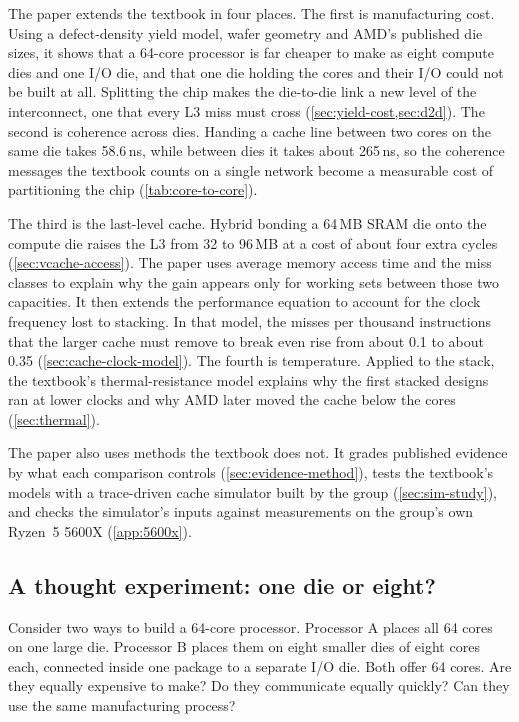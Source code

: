 The paper extends the textbook in four places. The first is manufacturing cost. Using a defect-density yield model, wafer geometry and AMD's published die sizes, it shows that a 64-core processor is far cheaper to make as eight compute dies and one I/O die, and that one die holding the cores and their I/O could not be built at all. Splitting the chip makes the die-to-die link a new level of the interconnect, one that every L3 miss must cross (\cref{sec:yield-cost,sec:d2d}). The second is coherence across dies. Handing a cache line between two cores on the same die takes 58.6\,ns, while between dies it takes about 265\,ns, so the coherence messages the textbook counts on a single network become a measurable cost of partitioning the chip (\cref{tab:core-to-core}).

The third is the last-level cache. Hybrid bonding a 64\,MB SRAM die onto the compute die raises the L3 from 32 to 96\,MB at a cost of about four extra cycles (\cref{sec:vcache-access}). The paper uses average memory access time and the miss classes to explain why the gain appears only for working sets between those two capacities. It then extends the performance equation to account for the clock frequency lost to stacking. In that model, the misses per thousand instructions that the larger cache must remove to break even rise from about 0.1 to about 0.35 (\cref{sec:cache-clock-model}). The fourth is temperature. Applied to the stack, the textbook's thermal-resistance model explains why the first stacked designs ran at lower clocks and why AMD later moved the cache below the cores (\cref{sec:thermal}).

The paper also uses methods the textbook does not. It grades published evidence by what each comparison controls (\cref{sec:evidence-method}), tests the textbook's models with a trace-driven cache simulator built by the group (\cref{sec:sim-study}), and checks the simulator's inputs against measurements on the group's own Ryzen~5 5600X (\cref{app:5600x}).

\subsection{A thought experiment: one die or eight?}
\label{sec:thought-experiment}
Consider two ways to build a 64-core processor. Processor A places all 64 cores on one large die. Processor B places them on eight smaller dies of eight cores each, connected inside one package to a separate I/O die. Both offer 64 cores. Are they equally expensive to make? Do they communicate equally quickly? Can they use the same manufacturing process?

